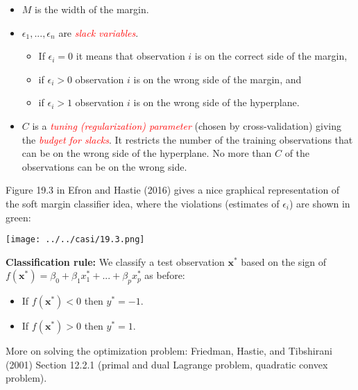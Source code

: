 \documentclass[10pt,ignorenonframetext,]{beamer}
\providecommand{\tightlist}{%
  \setlength{\itemsep}{0pt}\setlength{\parskip}{0pt}}
\begin{document}
\begin{frame}

\begin{itemize}
\item
  \(M\) is the width of the margin.
\item
  \(\epsilon_1,...,\epsilon_n\) are
  \emph{\textcolor{red}{slack variables}}.

  \begin{itemize}
  \tightlist
  \item
    If \(\epsilon_i=0\) it means that observation \(i\) is on the
    correct side of the margin,
  \item
    if \(\epsilon_i>0\) observation \(i\) is on the wrong side of the
    margin, and
  \item
    if \(\epsilon_i>1\) observation \(i\) is on the wrong side of the
    hyperplane.
  \end{itemize}
\item
  \(C\) is a \emph{\textcolor{red}{tuning (regularization) parameter}}
  (chosen by cross-validation) giving the
  \emph{\textcolor{red}{budget for slacks}}. It restricts the number of
  the training observations that can be on the wrong side of the
  hyperplane. No more than \(C\) of the observations can be on the wrong
  side.
\end{itemize}

\end{frame}

\begin{frame}

Figure 19.3 in Efron and Hastie (2016) gives a nice graphical
representation of the soft margin classifier idea, where the violations
(estimates of \(\epsilon_i\)) are shown in green:

\centering
\texttt{[image: ../../casi/19.3.png]}

\end{frame}

\begin{frame}

\textbf{Classification rule:} We classify a test observation
\({\boldsymbol x}^*\) based on the sign of
\(f({\boldsymbol x}^*)=\beta_0+\beta_1 x_1^*+...+\beta_p x_p^*\) as
before:

\begin{itemize}
\tightlist
\item
  If \(f({\boldsymbol x}^*)<0\) then \(y^*=-1\).
\item
  If \(f({\boldsymbol x}^*)>0\) then \(y^*=1\).
\end{itemize}

More on solving the optimization problem: Friedman, Hastie, and
Tibshirani (2001) Section 12.2.1 (primal and dual Lagrange problem,
quadratic convex problem).

\end{frame}
\end{document}
